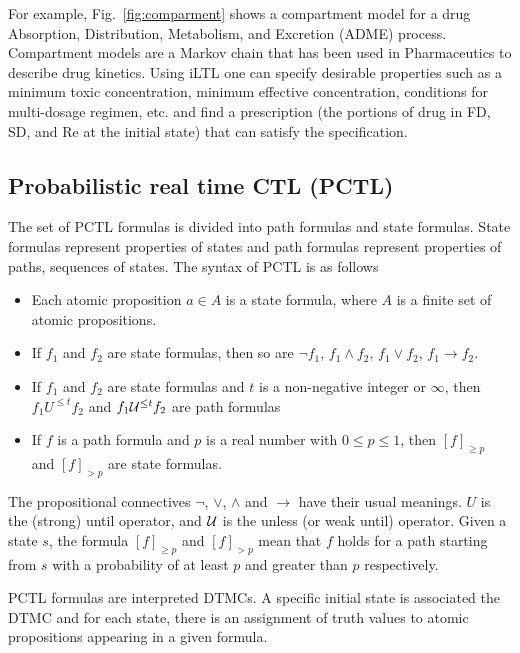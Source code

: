 For example, Fig.~\ref{fig:comparment} shows a compartment model for a drug Absorption, Distribution, Metabolism, and Excretion (ADME) process. Compartment models are a Markov chain that has been used in Pharmaceutics to describe drug kinetics. Using iLTL one can specify desirable properties such as a minimum toxic concentration, minimum effective concentration, conditions for multi-dosage regimen, etc. and find a prescription (the portions of drug in FD, SD, and Re at the initial state) that can satisfy the specification.



\subsection{Probabilistic real time CTL (PCTL)}

The set of PCTL formulas is divided into path formulas and state formulas. State formulas represent properties of states and path formulas represent properties of paths, sequences of states.
The syntax of PCTL is as follows
\begin{itemize}
\item Each atomic proposition $a\in A$ is a state formula, where $A$ is a finite set of atomic propositions.
\item If $f_1$ and $f_2$ are state formulas, then so are $\neg f_1$, $f_1 \wedge f_2$, $f_1 \vee f_2$, $f_1\rightarrow f_2$.
\item If $f_1$ and $f_2$ are state formulas and $t$ is a non-negative integer or $\infty$, then $f_1 U^{\leq t} f_2$ and $f_1 {\cal U}^{\leq t} f_2$ are path formulas
\item If $f$ is a path formula and $p$ is a real number with $0\leq p\leq 1$, then $[f]_{\geq p}$ and $[f]_{>p}$ are state formulas.
\end{itemize}
The propositional connectives $\neg$, $\vee$, $\wedge$ and $\rightarrow$ have their usual meanings. $U$ is the (strong) until operator, and $\cal U$ is the unless (or weak until) operator. Given a state $s$, the formula $[f]_{\geq p}$ and $[f]_{>p}$ mean that $f$ holds for a path starting from $s$ with a probability of at least $p$ and greater than $p$ respectively.

PCTL formulas are interpreted DTMCs. A specific initial state is associated the DTMC and for each state, there is an assignment of truth values to atomic propositions appearing in a given formula.

